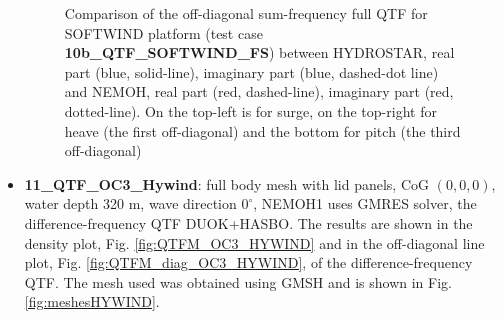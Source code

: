 \documentclass[12pt,a4paper,titlepage]{article}
\begin{document}
\begin{itemize}
\begin{figure}[h!tbp]
{}
	\caption{Comparison of the off-diagonal sum-frequency full QTF for SOFTWIND platform (test case \textbf{10b\_QTF\_SOFTWIND\_FS}) between HYDROSTAR, real part (blue, solid-line), imaginary part (blue, dashed-dot line) and NEMOH, real part (red, dashed-line), imaginary part (red, dotted-line). On the top-left is for surge, on the top-right for heave (the first off-diagonal) and the bottom for pitch (the third off-diagonal)}\label{fig:QTFP_SOFTWIND_DIAG}
\end{figure}


\item \textbf{11\_QTF\_OC3\_Hywind}: full body mesh with lid panels, CoG $(0,0,0)$, water depth 320 m, wave direction $0^{\circ}$, NEMOH1 uses GMRES solver, the difference-frequency QTF DUOK+HASBO. The results are shown in the density plot, Fig. \ref{fig:QTFM_OC3_HYWIND} and in the off-diagonal line plot, Fig. \ref{fig:QTFM_diag_OC3_HYWIND}, of the difference-frequency QTF. The mesh used was obtained using GMSH \cite{gmsh} and is shown in Fig. \ref{fig:meshesHYWIND}.
\end{itemize}
\end{document}
